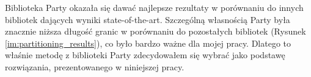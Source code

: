 Biblioteka Party \cite{1364754} okazała się dawać najlepsze rezultaty w porównaniu do innych bibliotek dających wyniki
state-of-the-art.
Szczególną własnością Party była znacznie niższa długość granic w porównaniu do pozostałych bibliotek
(Rysunek \ref{im:partitioning_results}), co było bardzo ważne dla mojej pracy.
Dlatego to właśnie metodę z biblioteki
Party zdecydowałem się wybrać jako podstawę rozwiązania, prezentowanego w niniejszej pracy.